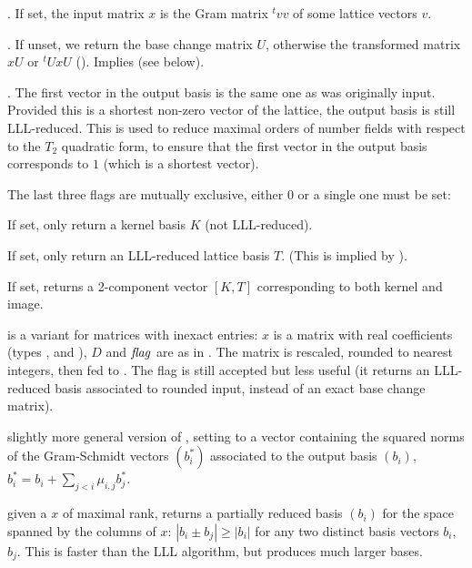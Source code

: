 \item  {}. If set, the input matrix $x$ is the Gram matrix ${}^t
v v$ of some lattice vectors $v$.

\item  {}. If unset, we return the base change matrix $U$,
otherwise the transformed matrix $x U$ or ${}^t U x U$ ().
Implies  (see below).

\item  {}. The first vector in the output basis is the same
one as was originally input. Provided this is a shortest non-zero vector of
the lattice, the output basis is still LLL-reduced. This is used to reduce
maximal orders of number fields with respect to the $T_2$ quadratic form, to
ensure that the first vector in the output basis corresponds to $1$ (which is
a shortest vector).

The last three flags are mutually exclusive, either 0 or a single one must be
set:

\item  {} If set, only return a kernel basis $K$ (not LLL-reduced).

\item  {} If set, only return an LLL-reduced lattice basis $T$.
(This is implied by ).

\item  {} If set, returns a 2-component vector $[K, T]$
corresponding to both kernel and image.


 is a variant for matrices
with inexact entries: $x$ is a matrix with real coefficients (types
,  and ), $D$ and $\hbox{\it f\kern0pt lag\/}$ are as in .
The matrix is rescaled, rounded to nearest integers, then fed to
. The flag  is still accepted but less useful
(it returns an LLL-reduced basis associated to rounded input, instead of an
exact base change matrix).

 slightly more
general version of , setting  to a vector containing
the squared norms of the Gram-Schmidt vectors $(b_i^*)$ associated to the
output basis $(b_i)$, $b_i^* = b_i + \sum_{j < i} \mu_{i,j} b_j^*$.


 given a  $x$ of maximal rank,
returns a partially reduced basis $(b_i)$ for the space spanned by the
columns of $x$: $|b_i \pm b_j| \geq |b_i|$ for any two distinct basis vectors
$b_i$, $b_j$. This is faster than the LLL algorithm, but produces much larger
bases.

